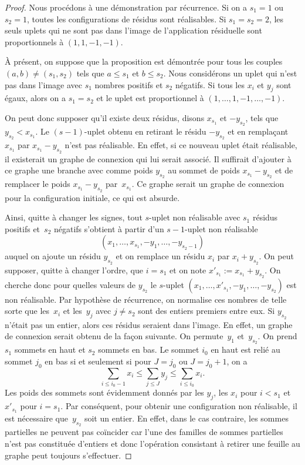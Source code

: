 \begin{proof}
Nous procédons à une démonstration par récurrence.
Si on a $s_{1}=1$ ou $s_{2}=1$, toutes les configurations de résidus sont réalisables. Si $s_{1}=s_{2}=2$, les seuls uplets qui ne sont pas dans l'image de l'application résiduelle sont proportionnels à $(1,1,-1,-1)$.

À présent, on suppose que la proposition est démontrée pour tous les couples $(a,b)\neq (s_{1},s_{2})$ tels que $a \leq s_{1}$ et $b \leq s_{2}$. Nous considérons un uplet qui n'est pas dans l'image avec $s_{1}$ nombres positifs et $s_{2}$ négatifs. Si tous les $x_{i}$ et $y_{j}$ sont égaux, alors on a $s_{1}=s_{2}$ et le uplet est proportionnel à $(1,\dots,1,-1,\dots,-1)$.

On peut donc supposer qu'il existe deux résidus, disons $x_{s_{1}}$ et $-y_{s_{2}}$, tels que \hbox{$y_{s_{2}}<x_{s_{1}}$}. Le $(s-1)$-uplet obtenu en retirant le résidu $-y_{s_{2}}$ et en remplaçant $x_{s_{1}}$ par $x_{s_{1}}-y_{s_{2}}$ n'est pas réalisable. En effet, si ce nouveau uplet était réalisable, il existerait un graphe de connexion qui lui serait associé. Il suffirait d'ajouter à ce graphe une branche avec comme poids $y_{s_{2}}$ au sommet de poids $x_{s_{1}}-y_{s_{2}}$ et de remplacer le poids $x_{s_{1}}-y_{s_{2}}$ par~$x_{s_{1}}$. Ce graphe serait un graphe de connexion pour la configuration initiale, ce qui est absurde.

Ainsi, quitte à changer les signes, tout $s$-uplet non réalisable avec $s_{1}$ résidus positifs et~$s_{2}$ négatifs s'obtient à partir d'un $s-1$-uplet non réalisable
\[
(x_{1},\dots,x_{s_{1}},-y_{1},\dots,-y_{s_{2}-1})
\]
auquel on ajoute un résidu $y_{s_{2}}$ et on remplace un résidu $x_{i}$ par $x_{i}+y_{s_{2}}$. On peut supposer, quitte à changer l'ordre, que $i=s_{1}$ et on note $x'_{s_{1}}:=x_{s_{1}}+y_{s_{2}}$.
On cherche donc pour quelles valeurs de $y_{s_{2}}$ le $s$-uplet $(x_{1},\dots,x'_{s_{1}},-y_{1},\dots,-y_{s_{2}})$ est non réalisable. Par hypothèse de récurrence, on normalise ces nombres de telle sorte que les~$x_{i}$ et les~$y_{j}$ avec $j\neq s_{2}$ sont des entiers premiers entre eux.
Si $y_{s_{2}}$ n'était pas un entier, alors ces résidus seraient dans l'image. En effet, un graphe de connexion serait obtenu de la façon suivante. On permute~$y_{1}$ et~$y_{s_{2}}$. On prend $s_{1}$ sommets en haut et $s_{2}$ sommets en bas. Le sommet $i_{0}$ en haut est relié au sommet $j_{0}$ en bas si et seulement si pour $J=j_{0}$ ou $J=j_{0}+1$, on a
\[
 \sum_{i\leq i_{0}-1}x_{i}\leq \sum_{j\leq J} y_{j} \leq \sum_{i\leq i_{0}}x_{i}.\]
Les poids des sommets sont évidemment donnés par les $y_{j}$, les $x_{i}$ pour $i<s_{1}$ et~$x'_{s_{1}}$ pour $i=s_{1}$.
Par conséquent, pour obtenir une configuration non réalisable, il est nécessaire que~$y_{s_{2}}$ soit un entier. En effet, dans le cas contraire, les sommes partielles ne peuvent pas coïncider car l'une des familles de sommes partielles n'est pas constituée d'entiers et donc l'opération consistant à retirer une feuille au graphe peut toujours s'effectuer.
\end{proof}

